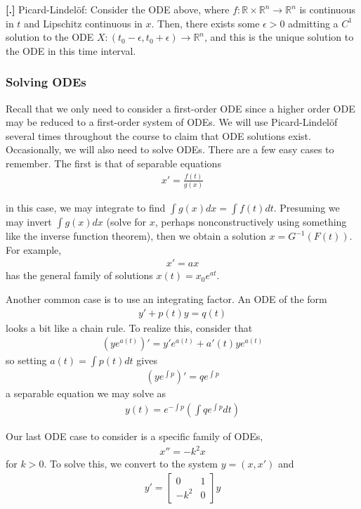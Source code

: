 \documentclass{article}
\newcommand{\R}{{\mathbb{R}}}
\newcounter{result}[section]
\newenvironment{res}[1][]{\refstepcounter{result}\par\medskip
	\noindent \textbf{[\thesection.\theresult] #1} \rmfamily}{\medskip}
\begin{document}
	\begin{res}
		Picard-Lindel{\"o}f: Consider the ODE above, where $f: \R \times \R^{n} \to \R^{n}$ is continuous in $t$ and Lipschitz continuous in $x$. Then, there exists some $\epsilon > 0$ admitting a $C^{1}$ solution to the ODE $X: (t_0 - \epsilon, t_0 + \epsilon) \to \R^{n}$, and this is the unique solution to the ODE in this time interval. 
	\end{res}
	
	\subsubsection{Solving ODEs}
	
	Recall that we only need to consider a first-order ODE since a higher order ODE may be reduced to a first-order system of ODEs. We will use Picard-Lindel{\"o}f several times throughout the course to claim that ODE solutions exist. Occasionally, we will also need to solve ODEs. There are a few easy cases to remember. The first is that of separable equations 
	\begin{align*}
		x' = \frac{f(t)}{g(x)}
	\end{align*}
	
	in this case, we may integrate to find $\int g(x)dx = \int f(t)dt$. Presuming we may invert $\int g(x)dx$ (solve for $x$, perhaps nonconstructively using something like the inverse function theorem), then we obtain a solution $x = G^{-1}(F(t))$. For example,
	\begin{align*}
		x' = ax
	\end{align*}
	has the general family of solutions $x(t) = x_0e^{at}$. 
	
	Another common case is to use an integrating factor. An ODE of the form
	\begin{align*}
		y' + p(t) y = q(t)
	\end{align*}
	looks a bit like a chain rule. To realize this, consider that 
	\begin{align*}
		(ye^{a(t)})' = y'e^{a(t)} + a'(t)ye^{a(t)}
	\end{align*}
	so setting $a(t) = \int p(t)dt$ gives 
	\begin{align*}
		(y e^{\int p})' = qe^{\int p}
	\end{align*}
	a separable equation we may solve as 
	\begin{align*}
		y(t) = e^{-\int p} ( \int qe^{\int p} dt)
	\end{align*}
	
	Our last ODE case to consider is a specific family of ODEs,
	\begin{align*}
		x'' = -k^{2}x
	\end{align*}
	for $k>0$. To solve this, we convert to the system $y = (x,x')$ and 
	\begin{align*}
		y' = \begin{bmatrix}0 & 1 \\ -k^{2} & 0\end{bmatrix} y
	\end{align*}
	
\end{document}
